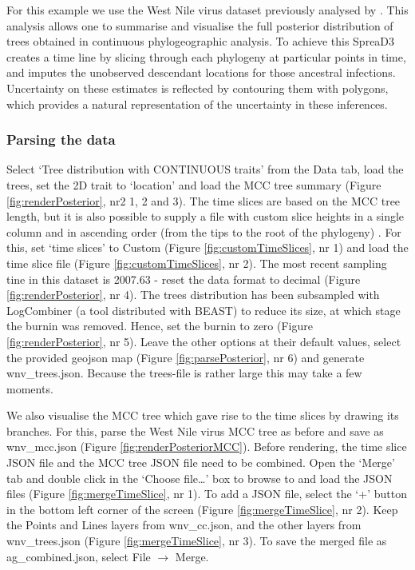 \documentclass[english]{paper}
\begin{document}
For this example we use the West Nile virus dataset previously analysed by \citet{Pybus:2012aa}.
This analysis allows one to summarise and visualise the full posterior distribution of trees obtained in continuous phylogeographic analysis. 
To achieve this SpreaD3 creates a time line by slicing through each phylogeny at particular points in time, and imputes the unobserved descendant locations for those ancestral infections.
Uncertainty on these estimates is reflected by contouring them with polygons, which provides a natural representation of the uncertainty in these inferences. 

\subsubsection{Parsing the data}

Select `Tree distribution with CONTINUOUS traits' from the Data tab, load the trees, set the 2D trait to `location' and load the MCC tree summary (Figure \ref{fig:renderPosterior}, nr2 1, 2 and 3).
The time slices are based on the MCC tree length, but it is also possible to supply a file with custom slice heights in a single column and in ascending order (from the tips to the root of the phylogeny) . 
For this, set `time slices' to Custom (Figure \ref{fig:customTimeSlices}, nr 1) and load the time slice file (Figure \ref{fig:customTimeSlices}, nr 2).
The most recent sampling tine in this dataset is 2007.63 - reset the data format to decimal (Figure \ref{fig:renderPosterior}, nr 4).
The trees distribution has been subsampled with LogCombiner (a tool distributed with BEAST) to reduce its size, at which stage the burnin was removed. 
Hence, set the burnin to zero (Figure \ref{fig:renderPosterior}, nr 5).
Leave the other options at their default values, select the provided geojson map (Figure \ref{fig:parsePosterior}, nr 6) and generate wnv\_trees.json.
Because the trees-file is rather large this may take a few moments.
\par
We also visualise the MCC tree which gave rise to the time slices by drawing its branches.
For this, parse the West Nile virus MCC tree as before and save as wnv\_mcc.json (Figure \ref{fig:renderPosteriorMCC}).
Before rendering, the time slice JSON file and the MCC tree JSON file need to be combined.
Open the `Merge' tab and double click in the `Choose file\dots' box to browse to and load the JSON files (Figure \ref{fig:mergeTimeSlice}, nr 1).
To add a JSON file, select the `+' button in the bottom left corner of the screen (Figure \ref{fig:mergeTimeSlice}, nr 2).
Keep the Points and Lines layers from wnv\_cc.json, and the other layers from wnv\_trees.json (Figure \ref{fig:mergeTimeSlice}, nr 3).
To save the merged file as ag\_combined.json, select File $\rightarrow$  Merge. 
\end{document}
